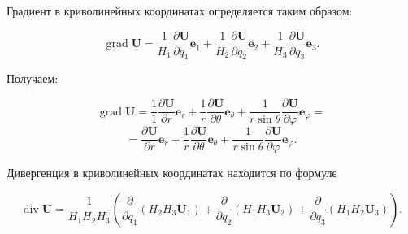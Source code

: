 \documentclass{article}
\begin{document}
\begin{enumerate}
{Градиент в криволинейных координатах определяется таким образом:

$$\operatorname{grad}\textbf{U} = \dfrac {1}{H_1} \dfrac {\partial \textbf{U}}{\partial q_1} \textbf{e}_1 + \dfrac {1}{H_2} \dfrac {\partial \textbf{U}}{\partial q_2} \textbf{e}_2 + \dfrac {1}{H_3} \dfrac {\partial \textbf{U}}{\partial q_3} \textbf{e}_3. $$

Получаем:

$$\operatorname{grad}\textbf{U} = \dfrac {1}{1} \dfrac {\partial \textbf{U}}{\partial r} \textbf{e}_r + \dfrac {1}{r} \dfrac {\partial \textbf{U}}{\partial \theta} \textbf{e}_\theta + \dfrac {1}{r \sin{\theta}} \dfrac {\partial \textbf{U}}{\partial \varphi} \textbf{e}_\varphi=$$
$$= \dfrac {\partial \textbf{U}}{\partial r} \textbf{e}_r + \dfrac {1}{r} \dfrac {\partial \textbf{U}}{\partial \theta} \textbf{e}_\theta + \dfrac {1}{r \sin{\theta}} \dfrac {\partial \textbf{U}}{\partial \varphi} \textbf{e}_\varphi.$$

Дивергенция в криволинейных координатах находится по формуле

$$\operatorname{div}\textbf{U} = \dfrac {1}{H_1 H_2 H_3} \left( \dfrac {\partial}{\partial q_1} \left(H_2 H_3 \textbf{U}_1\right) + \dfrac {\partial}{\partial q_2} \left(H_1 H_3 \textbf{U}_2\right) + \dfrac {\partial}{\partial q_3} \left(H_1 H_2 \textbf{U}_3\right)\right).$$

}
\end{enumerate}
\end{document}
